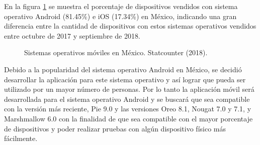 En la figura \ref{fig:mercadoMexico} se muestra el porcentaje de dispositivos vendidos con sistema operativo Android (81.45\%) e iOS (17.34\%) en México, indicando una gran diferencia entre la cantidad de dispositivos con estos sistemas operativos vendidos entre octubre de 2017 y septiembre de 2018. \\

\begin{figure}[htbp!]
	\centering
	\caption{Sistemas operativos móviles en México. Statcounter (2018).}
	\label{fig:mercadoMexico}
\end{figure}

Debido a la popularidad del sistema operativo Android en México, se decidió desarrollar la aplicación para este sistema operativo y así lograr que pueda ser utilizado por un mayor número de personas. Por lo tanto la aplicación móvil será desarrollada para el sistema operativo Android y se buscará que sea compatible con la versión más reciente, Pie 9.0 y las versiones Oreo 8.1, Nougat 7.0 y 7.1, y Marshmallow 6.0 con la finalidad de que sea compatible con el mayor porcentaje de dispositivos y poder realizar pruebas con algún dispositivo físico más fácilmente. \\

\clearpage